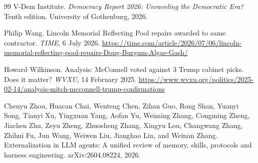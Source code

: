 \documentclass[11pt,a4paper]{article}
\theoremstyle{remark}
\begin{document}
\begin{thebibliography}{99}
V-Dem Institute.
\newblock \emph{Democracy Report 2026: Unraveling the Democratic Era?}
\newblock Tenth edition. University of Gothenburg, 2026.

Philip Wang.
\newblock Lincoln Memorial Reflecting Pool repairs awarded to same contractor.
\newblock \emph{TIME}, 6 July 2026.
\newblock \url{https://time.com/article/2026/07/06/lincoln-memorial-reflecting-pool-repairs-Doug-Burgum-Algae-Gash/}


Howard Wilkinson.
\newblock Analysis: McConnell voted against 3 Trump cabinet picks. Does it matter?
\newblock \emph{WVXU}, 14 February 2025.
\newblock \url{https://www.wvxu.org/politics/2025-02-14/analysis-mitch-mcconnell-trump-confirmations}

Chenyu Zhou, Huacan Chai, Wenteng Chen, Zihan Guo, Rong Shan, Yuanyi Song, Tianyi Xu, Yingxuan Yang, Aofan Yu, Weiming Zhang, Congming Zheng, Jiachen Zhu, Zeyu Zheng, Zhuosheng Zhang, Xingyu Lou, Changwang Zhang, Zhihui Fu, Jun Wang, Weiwen Liu, Jianghao Lin, and Weinan Zhang.
\newblock Externalization in LLM agents: A unified review of memory, skills, protocols and harness engineering.
\newblock arXiv:2604.08224, 2026.

\end{thebibliography}
\end{document}
